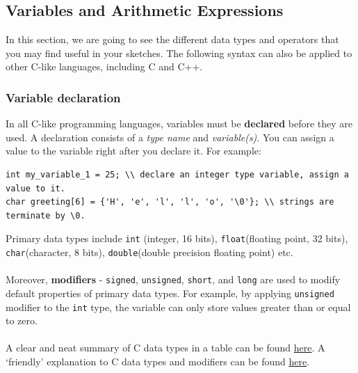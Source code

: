 \documentclass{article}
\begin{document}
\subsection{Variables and Arithmetic Expressions}
In this section, we are going to see the different data types and operators that you may find useful in your sketches. The following syntax can also be applied to other C-like languages, including C and C++.
\subsubsection{Variable declaration}
In all C-like programming languages, variables must be \textbf{declared} before they are used. A declaration consists of a \textit{type name} and \textit{variable(s)}. You can assign a value to the variable right after you declare it. For example:
\begin{lstlisting}
int my_variable_1 = 25; \\ declare an integer type variable, assign a value to it.
char greeting[6] = {'H', 'e', 'l', 'l', 'o', '\0'}; \\ strings are terminate by \0.
\end{lstlisting}\vspace{-.5cm}
Primary data types include \texttt{int} (integer, 16 bits),  \texttt{float}(floating point, 32 bits), \texttt{char}(character, 8 bits), \texttt{double}(double precision floating point) etc. \\\\Moreover, \textbf{modifiers} - \texttt{signed}, \texttt{unsigned}, \texttt{short}, and \texttt{long} are used to modify default properties of primary data types. For example, by applying \texttt{unsigned} modifier to the \texttt{int} type, the variable can only store values greater than or equal to zero.\\\\A clear and neat summary of C data types in a table can be found \href{https://en.wikipedia.org/wiki/C_data_types}{here}. A  `friendly' explanation to C data types and modifiers can be found \href{https://www.journaldev.com/26779/data-types-and-modifiers-in-c}{here}. 
\end{document}
